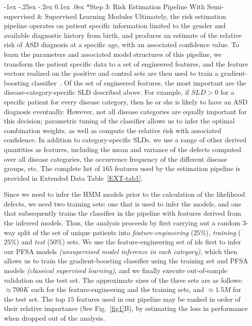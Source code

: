 \documentclass[onecolumn,,10pt]{IEEEtran}
\makeatletter
\renewcommand\subsection{\@startsection {section}{1}{\z@}%
  {-1ex \@plus -.25ex \@minus -.2ex}%
  {0.1ex \@plus.0ex}%
  {\fontsize{11}{12}\selectfont\bfseries\sffamily\color{DodgerBlue4}}}
\def\treatment{positive\xspace}
\makeatother
\begin{document}
\subsection*{Step 3: Risk Estimation Pipeline With Semi-supervised \& Supervised Learning Modules}
Ultimately, the risk estimation pipeline operates on patient specific information limited to the
gender and available  diagnostic history from birth, and produces an estimate of the relative risk of ASD diagnosis at a specific age, with an associated  confidence value.
To learn the parameters and associated model structures of  this pipeline, we transform the patient specific data to a set of engineered features, and the feature vectors realized on the
\treatment and control sets are then used to train a gradient-boosting classifier~\cite{gbm02}. Of the set of engineered features, the most important are the  disease-category-specific SLD described above. For example, if $SLD > 0$ for a specific patient for every disease category, then he or she is likely to have an ASD diagnosis eventually. However, not all disease categories are equally important for this decision; parametric  tuning of the classifier allows us to infer the optimal combination weights, as well as compute the relative risk  with associated confidence. In addition to category-specific SLDs, we use a range of other derived quantities as features, including the mean and variance of the defects computed over all disease categories, the occurrence frequency of the different disease groups, etc. The complete list of $165$ features used by the  estimation pipeline  is provided in Extended Data Table~\ref{EXT-tab1}.

Since we need to infer the HMM models prior to the calculation of the likelihood defects, we need two training sets: one that is used to infer the models, and one that subsequently trains the classifier in the  pipeline with features  derived  from the inferred models. Thus, the analysis proceeds by first carrying out a random 3-way split of the set of unique patients into \textit{feature-engineering} ($25\%$), \textit{training} ($25\%$) and \textit{test} ($50\%$) sets. We use the feature-engineering set of ids first to infer our PFSA models \textit{(unsupervised model inference in each category)}, which then allows us to train the gradient-boosting classifier using the training set and PFSA models \textit{(classical supervised learning)}, and we finally execute  out-of-sample validation on the test set. The approximate sizes of the three sets are as follows: $\approx 700K$ each for the feature-engineering and the training sets, and $\approx 1.5M$ for the test set. The top $15$ features used in our pipeline may be ranked in order of their relative importance (See Fig.~\ref{fig1}B), by
estimating the loss in performance when dropped out of the analysis.
\end{document}
